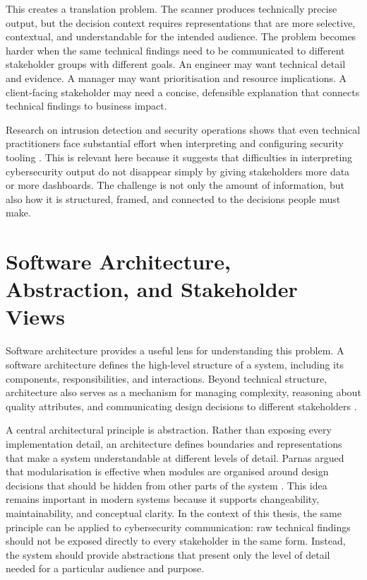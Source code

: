 This creates a translation problem. The scanner produces technically precise output, but the decision context requires representations that are more selective, contextual, and understandable for the intended audience. The problem becomes harder when the same technical findings need to be communicated to different stakeholder groups with different goals. An engineer may want technical detail and evidence. A manager may want prioritisation and resource implications. A client-facing stakeholder may need a concise, defensible explanation that connects technical findings to business impact.

Research on intrusion detection and security operations shows that even technical practitioners face substantial effort when interpreting and configuring security tooling \cite{werlinger2008ids}. This is relevant here because it suggests that difficulties in interpreting cybersecurity output do not disappear simply by giving stakeholders more data or more dashboards. The challenge is not only the amount of information, but also how it is structured, framed, and connected to the decisions people must make.

\section{Software Architecture, Abstraction, and Stakeholder Views}

Software architecture provides a useful lens for understanding this problem. A software architecture defines the high-level structure of a system, including its components, responsibilities, and interactions. Beyond technical structure, architecture also serves as a mechanism for managing complexity, reasoning about quality attributes, and communicating design decisions to different stakeholders \cite{bass2012software}.

A central architectural principle is abstraction. Rather than exposing every implementation detail, an architecture defines boundaries and representations that make a system understandable at different levels of detail. Parnas argued that modularisation is effective when modules are organised around design decisions that should be hidden from other parts of the system \cite{parnas1972modules}. This idea remains important in modern systems because it supports changeability, maintainability, and conceptual clarity. In the context of this thesis, the same principle can be applied to cybersecurity communication: raw technical findings should not be exposed directly to every stakeholder in the same form. Instead, the system should provide abstractions that present only the level of detail needed for a particular audience and purpose.

